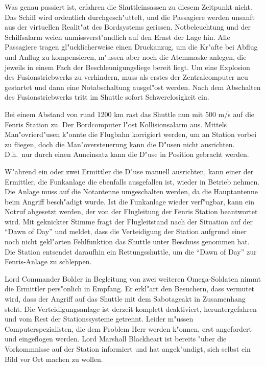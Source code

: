 Was genau passiert ist, erfahren die Shuttleinsassen zu diesem Zeitpunkt nicht. Das Schiff wird ordentlich durchgesch"uttelt, und die Passagiere werden unsanft aus der virtuellen Realit"at des Bordsystems gerissen. Notbeleuchtung und der Schiffsalarm wei\3en unmissverst"andlich auf den Ernst der Lage hin. Alle Passagiere tragen gl"ucklicherweise einen Druckanzug, um die Kr"afte bei Abflug und Anflug zu kompensieren, m"ussen aber noch die Atemmaske anlegen, die jeweils in einem Fach der Beschleunigungsliege bereit liegt. Um eine Explosion des Fusionstriebwerks zu verhindern, muss als erstes der Zentralcomputer neu gestartet und dann eine Notabschaltung ausgel"ost werden. Nach dem Abschalten des Fusionstriebwerks tritt im Shuttle sofort Schwerelosigkeit ein.

Bei einem Abstand von rund 1200 km rast das Shuttle nun mit 500 m/s auf die Fenris Station zu. Der Bordcomputer l"ost Kollisionsalarm aus. Mittels Man"ovrierd"usen k"onnte die Flugbahn korrigiert werden, um an Station vorbei zu fliegen, doch die Man"oversteuerung kann die D"usen nicht ausrichten. D.h.~nur durch einen Au\3neinsatz kann die D"use in Position gebracht werden.

W"ahrend ein oder zwei Ermittler die D"use manuell ausrichten, kann einer der Ermittler, die Funkanlage die ebenfalls ausgefallen ist, wieder in Betrieb nehmen. Die Anlage muss auf die Notantenne umgeschalten werden, da die Hauptantenne beim Angriff besch"adigt wurde. Ist die Funkanlage wieder verf"ugbar, kann ein Notruf abgesetzt werden, der von der Flugleitung der Fenris Station beantwortet wird. Mit geknickter Stimme fragt der Flugleitstand nach der Situation auf der "`Dawn of Day"' und meldet, dass die Verteidigung der Station aufgrund einer noch nicht gekl"arten Fehlfunktion das Shuttle unter Beschuss genommen hat. Die Station entsendet daraufhin ein Rettungsshuttle, um die "`Dawn of Day"' zur Fenris-Anlage zu schleppen.

Lord Commander Bolder in Begleitung von zwei weiteren Omega-Soldaten nimmt die Ermittler pers"onlich in Empfang. Er erkl"art den Besuchern, dass vermutet wird, dass der Angriff auf das Shuttle mit dem Sabotageakt in Zusamenhang steht. Die Verteidigungsanlage ist derzeit komplett deaktiviert, heruntergefahren und vom Rest der Stationssysteme getrennt. Leider m"ussen Computerspezialisten, die dem Problem Herr werden k"onnen, erst angefordert und eingeflogen werden. Lord Marshall Blackheart ist bereits "uber die Vorkommnisse auf der Station informiert und hat angek"undigt, sich selbst ein Bild vor Ort machen zu wollen.

